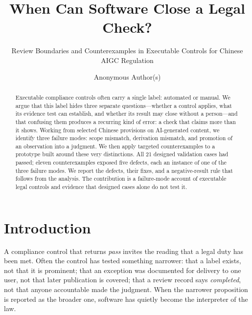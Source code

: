 \documentclass[sigconf,review,anonymous]{acmart}
\begin{document}
\title{When Can Software Close a Legal Check?}
\subtitle{Review Boundaries and Counterexamples in Executable Controls for Chinese AIGC Regulation}

\author{Anonymous Author(s)}

\begin{abstract}
Executable compliance controls often carry a single label: automated or manual. We argue that this label hides three separate questions---whether a control applies, what its evidence test can establish, and whether its result may close without a person---and that confusing them produces a recurring kind of error: a check that claims more than it shows. Working from selected Chinese provisions on AI-generated content, we identify three failure modes: scope mismatch, derivation mismatch, and promotion of an observation into a judgment. We then apply targeted counterexamples to a prototype built around these very distinctions. All 21 designed validation cases had passed; eleven counterexamples exposed five defects, each an instance of one of the three failure modes. We report the defects, their fixes, and a negative-result rule that follows from the analysis. The contribution is a failure-mode account of executable legal controls and evidence that designed cases alone do not test it.
\end{abstract}


\maketitle

\section{Introduction}

A compliance control that returns \emph{pass} invites the reading that a legal duty has been met. Often the control has tested something narrower: that a label exists, not that it is prominent; that an exception was documented for delivery to one user, not that later publication is covered; that a review record says \emph{completed}, not that anyone accountable made the judgment. When the narrower proposition is reported as the broader one, software has quietly become the interpreter of the law.
\end{document}
